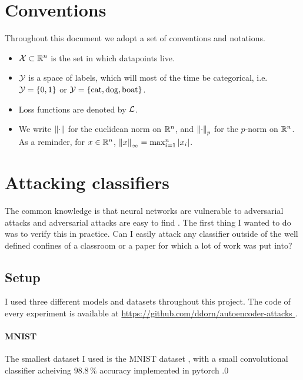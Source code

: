 \documentclass[]{scrarticle}
\begin{document}
  \clearpage
  \tableofcontents

\clearpage
\section*{Conventions}

Throughout this document we adopt a set of conventions and notations.
\begin{itemize}
  \item $\mathcal X \subset \mathbb R^n$ is the set in which datapoints live.
  \item $\mathcal Y$ is a space of labels, which will most of the time be categorical,
    i.e. $\mathcal Y = \left\{ 0, 1 \right\}$ or $\mathcal Y = \left\{ \text{cat}, \text{dog}, \text{boat} \right\}$.
  \item Loss functions are denoted by $\mathcal L$.
  \item We write $\left\| \cdot \right\|$ for the euclidean norm on $\mathbb R^n$,
    and $\left\| \cdot \right\|_p$ for the $p$-norm on $\mathbb R^n$.
    As a reminder, for $x \in \mathbb R^n$, $\left\| x \right\|_\infty = \max_{i=1}^n \left| x_i \right|$.
\end{itemize}


\clearpage

\section{Attacking classifiers}
The common knowledge is that neural networks are vulnerable to adversarial attacks
and adversarial attacks are easy to find \cite{szegedy2013intriguing,goodfellow2014explaining,liu2021survey}.
The first thing I wanted to do was to verify this in practice. Can I easily
attack any classifier outside of the well defined confines of a classroom
or a paper for which a lot of work was put into?

\subsection{Setup}
I used three different models and datasets throughout this project.
The code of every experiment is available at \url{
  https://github.com/ddorn/autoencoder-attacks
}.

\paragraph{MNIST}
The smallest dataset I used is the MNIST dataset \cite{LeCun1998GradientbasedLA},
with a small convolutional classifier acheiving $98.8\,\%$ accuracy implemented in pytorch \cite{tuomaso2022trainmnistfast}.0
\end{document}
